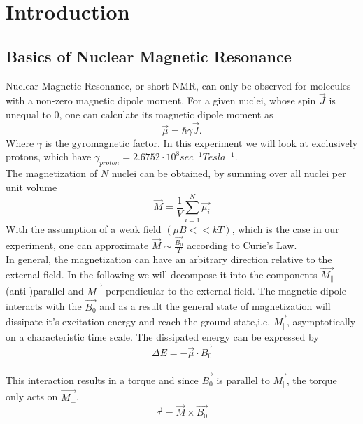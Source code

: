 \section{Introduction}\label{intro}
\subsection{Basics of Nuclear Magnetic Resonance}\label{basics}
Nuclear Magnetic Resonance, or short NMR, can only be observed for molecules with a non-zero magnetic dipole moment. For a given nuclei, whose spin $\vec{J}$ is unequal to 0, one can calculate its magnetic dipole moment as
\begin{equation}
	\label{1}
	\vec{\mu} = \hbar \gamma \vec{J}.
\end{equation}
Where $\gamma$ is the gyromagnetic factor. In this experiment we will look at exclusively protons, which have $\gamma_{proton} = 2.6752 \cdot 10^8 sec^{-1} Tesla^{-1}$.
\vspace{3mm} \\
The magnetization of $N$ nuclei can be obtained, by summing over all nuclei per unit volume
\begin{equation}
	\label{2}
	\vec{M} = \dfrac{1}{V} \sum^{N}_{i=1} \vec{\mu_i}
\end{equation}
With the assumption of a weak field $(\mu B << kT)$, which is the case in our experiment, one can approximate $\vec{M} \sim \frac{\vec{B_{0}}}{T}$ according to Curie's Law. 
\vspace{5mm} \\
In general, the magnetization can have an arbitrary direction relative to the external field. In the following we will decompose it into the components $\vec{M_{\parallel}}$ (anti-)parallel and $\vec{M_{\perp}}$ perpendicular to the external field. 
The magnetic dipole interacts with the $\vec{B_{0}}$ and as a result the general state of magnetization will dissipate it's excitation energy and reach the ground state,i.e. $\vec{M_{\parallel}}$, asymptotically on a characteristic time scale. The dissipated energy can be expressed by
\begin{equation}
	\label{5}
	\Delta E = - \vec{\mu} \cdot \vec{B_0}
\end{equation}
\vspace{3mm} \\
This interaction results in a torque and since $\vec{B_{0}}$ is parallel to $\vec{M_{\parallel}}$, the torque only acts on $\vec{M_{\perp}}$.
\begin{equation}
	\label{6}
	\vec{\tau} = \vec{M} \times \vec{B_{0}}
\end{equation}
